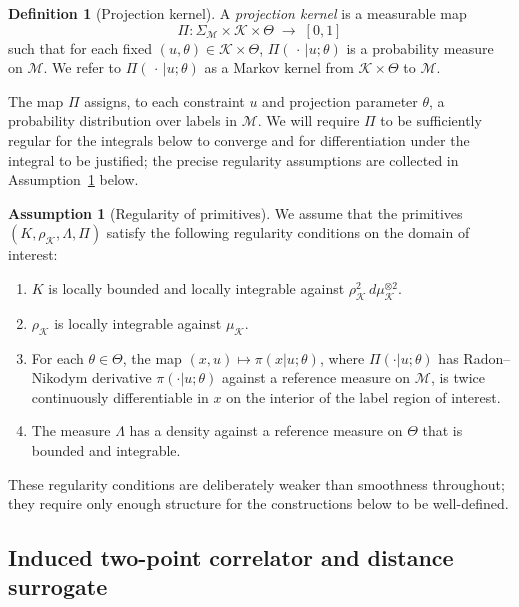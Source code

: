﻿\documentclass[12pt,a4paper]{article}
\theoremstyle{definition}
\newtheorem{definition}[theorem]{Definition}
\newtheorem{assumption}[theorem]{Assumption}
\begin{document}
\begin{definition}[Projection kernel]
A \emph{projection kernel} is a measurable map
\[
\Pi : \Sigma_{\mathcal{M}} \times \mathcal{K} \times \Theta \;\longrightarrow\; [0,1]
\]
such that for each fixed $(u,\theta) \in \mathcal{K} \times \Theta$, $\Pi(\,\cdot\,|u;\theta)$ is a probability measure on $\mathcal{M}$. We refer to $\Pi(\,\cdot\,|u;\theta)$ as a Markov kernel from $\mathcal{K} \times \Theta$ to $\mathcal{M}$.
\end{definition}

The map $\Pi$ assigns, to each constraint $u$ and projection parameter $\theta$, a probability distribution over labels in $\mathcal{M}$. We will require $\Pi$ to be sufficiently regular for the integrals below to converge and for differentiation under the integral to be justified; the precise regularity assumptions are collected in Assumption~\ref{ass:regularity} below.

\begin{assumption}[Regularity of primitives]
\label{ass:regularity}
We assume that the primitives $(K,\rho_{\mathcal{K}},\Lambda,\Pi)$ satisfy the following regularity conditions on the domain of interest:
\begin{enumerate}
  \item $K$ is locally bounded and locally integrable against $\rho_{\mathcal{K}}^2 \, d\mu_{\mathcal{K}}^{\otimes 2}$.
  \item $\rho_{\mathcal{K}}$ is locally integrable against $\mu_{\mathcal{K}}$.
  \item For each $\theta \in \Theta$, the map $(x,u) \mapsto \pi(x|u;\theta)$, where $\Pi(\cdot|u;\theta)$ has Radon--Nikodym derivative $\pi(\cdot|u;\theta)$ against a reference measure on $\mathcal{M}$, is twice continuously differentiable in $x$ on the interior of the label region of interest.
  \item The measure $\Lambda$ has a density against a reference measure on $\Theta$ that is bounded and integrable.
\end{enumerate}
\end{assumption}

These regularity conditions are deliberately weaker than smoothness throughout; they require only enough structure for the constructions below to be well-defined.

\subsection{Induced two-point correlator and distance surrogate}
\label{sec:G2}
\end{document}
